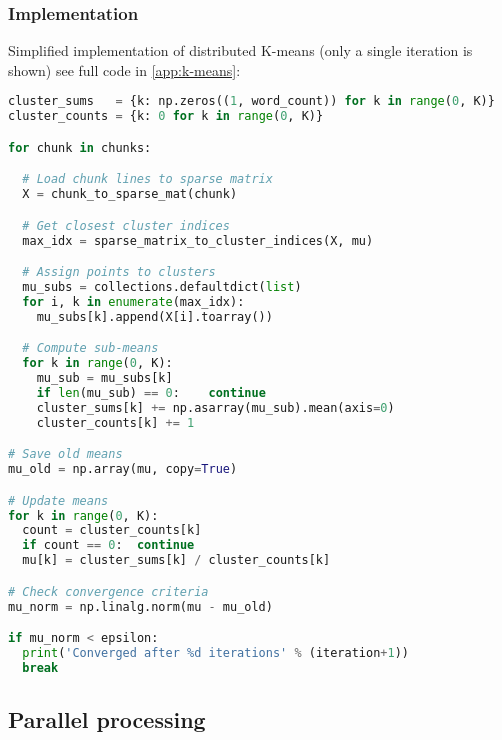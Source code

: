 \subsubsection{Implementation}

Simplified implementation of distributed K-means (only a single iteration is
shown) see full code in \cref{app:k-means}:

\begin{lstlisting}[language=python]
cluster_sums   = {k: np.zeros((1, word_count)) for k in range(0, K)}
cluster_counts = {k: 0 for k in range(0, K)}

for chunk in chunks:

  # Load chunk lines to sparse matrix
  X = chunk_to_sparse_mat(chunk)

  # Get closest cluster indices
  max_idx = sparse_matrix_to_cluster_indices(X, mu)

  # Assign points to clusters
  mu_subs = collections.defaultdict(list)
  for i, k in enumerate(max_idx):
    mu_subs[k].append(X[i].toarray())

  # Compute sub-means
  for k in range(0, K):
    mu_sub = mu_subs[k]
    if len(mu_sub) == 0:    continue
    cluster_sums[k] += np.asarray(mu_sub).mean(axis=0)
    cluster_counts[k] += 1

# Save old means
mu_old = np.array(mu, copy=True)

# Update means
for k in range(0, K):
  count = cluster_counts[k]
  if count == 0:  continue
  mu[k] = cluster_sums[k] / cluster_counts[k]

# Check convergence criteria
mu_norm = np.linalg.norm(mu - mu_old)

if mu_norm < epsilon:
  print('Converged after %d iterations' % (iteration+1))
  break
\end{lstlisting}







\subsection{Parallel processing}
